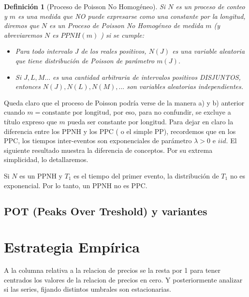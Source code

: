 \documentclass[
  oneside]{article}
\newtheorem{definition}{Definición}[section]
\begin{document}
\begin{definition}[Proceso de Poisson No Homogéneo]\label{def:3}
Si $N$ es un proceso de conteo y $m$ es una medida que NO puede expresarse como una constante por la longitud, diremos que $N$ es un Proceso de Poisson No Homogéneo de medida $m$ (y abreviaremos $N$ es $PPNH(m)$ ) si se cumple:

\begin{itemize}
\item[a)] Para todo intervalo $J$ de los reales positivos, $N(J)$ es una variable aleatoria que tiene distribución de Poisson de parámetro $m(J)$.
\item[b)] Si $J, L, M...$ es una cantidad arbitraria de intervalos positivos DISJUNTOS, entonces $N(J), N(L), N(M),...$ son variables aleatorias independientes.
\end{itemize}
\end{definition}

Queda claro que el proceso de Poisson podría verse de la manera a) y b)
anterior cuando \(m=\text{constante por longitud}\), por eso, para no
confundir, se excluye a título expreso que \(m\) pueda ser constante por
longitud. Para dejar en claro la diferencia entre los PPNH y los PPC ( o
el simple PP), recordemos que en los PPC, los tiempos inter-eventos son
exponenciales de parámetro \(\lambda>0\) e \(iid\). El siguiente
resultado muestra la diferencia de conceptos. Por su extrema
simplicidad, lo detallaremos.

\begin{theorem}\label{thm:2}
Si $N$ es un PPNH y $T_1$ es el tiempo del primer evento, la distribución de $T_1$ no es exponencial.
Por lo tanto, un PPNH no es PPC.
\end{theorem}

\newpage

\subsection{POT (Peaks Over Treshold) y variantes}

\newpage
\section{Estrategia Empírica}

A la columna relativa a la relacion de precios se la resta por 1 para
tener centrados los valores de la relacion de precios en cero. Y
posteriormente analizar si las series, fijando distintos umbrales son
estacionarias.
\end{document}

